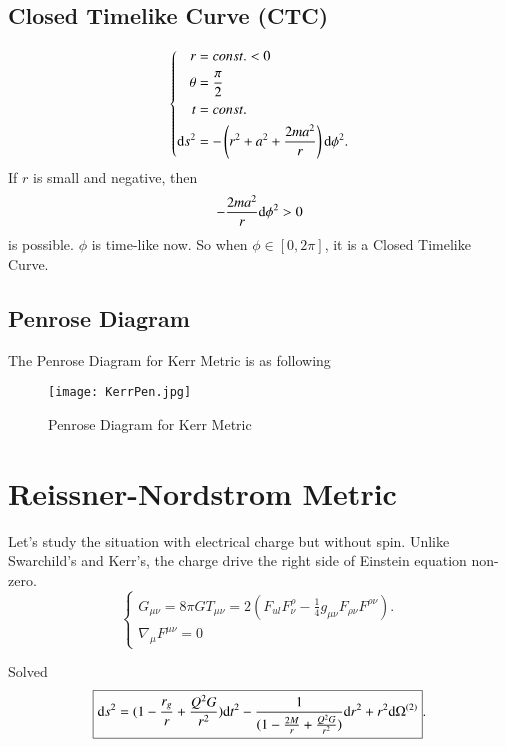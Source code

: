 \documentclass[openany,10pt]{book}
\theoremstyle{definition}
\theoremstyle{definition}
\theoremstyle{remark}
\begin{document}
\subsection{Closed Timelike Curve (CTC)}
\begin{equation}
\left\{\begin{aligned}
    r&=const.<0\\
    \theta&=\frac\pi2\\
    t&=const.\\
    {\rm d}s^2&=-\left(r^2+a^2+\frac{2ma^2}{r}\right){\rm d}\phi^2.
    \end{aligned}\right.
\end{equation}
If $r$ is small and negative, then
\begin{equation}
   -\frac{2ma^2}{r}{\rm d}\phi^2>0
\end{equation}
is possible. $\phi$ is time-like now. So when $\phi\in[0, 2\pi]$, it is a  Closed Timelike Curve.


\subsection{Penrose Diagram}
The Penrose Diagram for Kerr Metric is as following 

\begin{figure}[htbp]
    \centering
    \texttt{[image: KerrPen.jpg]}
    \caption{Penrose Diagram for Kerr Metric }
    
\end{figure}

\section{Reissner-Nordstrom Metric}
Let's study the situation with electrical charge but without spin.
Unlike Swarchild's and Kerr's, the charge drive the right side of Einstein equation non-zero.
\begin{equation}
   \begin{cases}
    G_{\mu\nu}=8\pi GT_{\mu\nu}=2(F_{ul}F^\rho_\nu-\frac{1}{4}g_{\mu\nu}F_{\rho\nu}F^{\rho\nu}).\\
    \nabla_\mu F^{\mu\nu}=0
    \end{cases}
\end{equation}

Solved
\begin{equation}
    \boxed{{\rm d}s^2=(1-\frac{r_g}{r}+\frac{Q^2G}{r^2}){\rm d}t^2-\frac{1}{(1-\frac{2M}{r}+\frac{Q^2G}{r^2})}{\rm d}r^2+r^2{\rm d}\Omega^{(2)}}.
\end{equation}
\end{document}
